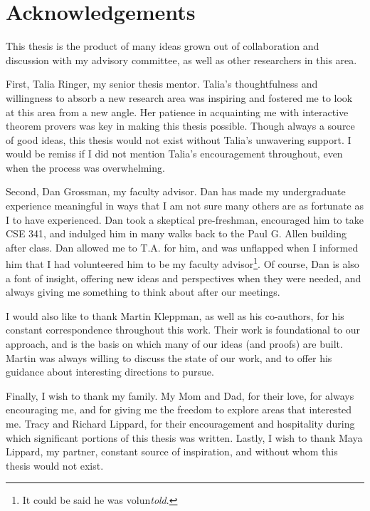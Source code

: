 \chapter*{Acknowledgements}

This thesis is the product of many ideas grown out of collaboration and
discussion with my advisory committee, as well as other researchers in this
area.

First, Talia Ringer, my senior thesis mentor. Talia's thoughtfulness and
willingness to absorb a new research area was inspiring and fostered me to
look at this area from a new angle. Her patience in acquainting me with
interactive theorem provers was key in making this thesis possible. Though
always a source of good ideas, this thesis would not exist without Talia's
unwavering support. I would be remiss if I did not mention Talia's encouragement
throughout, even when the process was overwhelming.

Second, Dan Grossman, my faculty advisor. Dan has made my undergraduate
experience meaningful in ways that I am not sure many others are as fortunate as
I to have experienced. Dan took a skeptical pre-freshman, encouraged him to take
CSE 341, and indulged him in many walks back to the Paul G. Allen building after
class. Dan allowed me to T.A. for him, and was unflapped when I informed him
that I had volunteered him to be my faculty advisor\footnote{It could be said he
was volun\textit{told}.}. Of course, Dan is also a font of insight, offering new
ideas and perspectives when they were needed, and always giving me something to
think about after our meetings.

I would also like to thank Martin Kleppman, as well as his co-authors, for his
constant correspondence throughout this work. Their work is foundational to our
approach, and is the basis on which many of our ideas (and proofs) are built.
Martin was always willing to discuss the state of our work, and to offer his
guidance about interesting directions to pursue.

Finally, I wish to thank my family. My Mom and Dad, for their love, for always
encouraging me, and for giving me the freedom to explore areas that interested
me. Tracy and Richard Lippard, for their encouragement and hospitality during
which significant portions of this thesis was written. Lastly, I wish to thank
Maya Lippard, my partner, constant source of inspiration, and without whom this
thesis would not exist.
